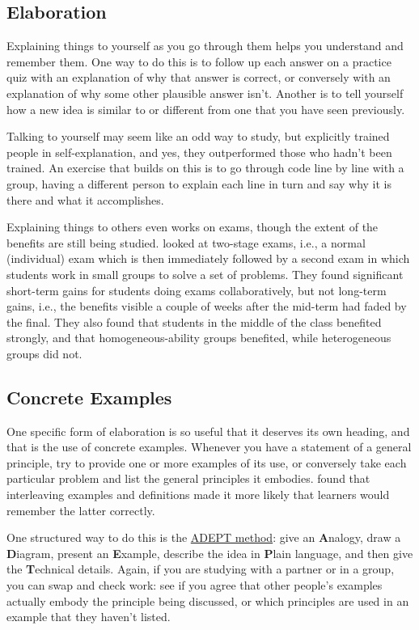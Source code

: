 \subsection*{Elaboration}

Explaining things to yourself as you go through them helps you
understand and remember them.  One way to do this is to follow up each
answer on a practice quiz with an explanation of why that answer is
correct, or conversely with an explanation of why some other plausible
answer isn't.  Another is to tell yourself how a new idea is similar
to or different from one that you have seen previously.

Talking to yourself may seem like an odd way to study, but
\cite{Biel1995} explicitly trained people in self-explanation, and
yes, they outperformed those who hadn't been trained.  An exercise
that builds on this is to go through code line by line with a group,
having a different person to explain each line in turn and say why it
is there and what it accomplishes.

Explaining things to others even works on exams, though the extent of
the benefits are still being studied.  \cite{Cao2017a,Cao2017b} looked
at two-stage exams, i.e., a normal (individual) exam which is then
immediately followed by a second exam in which students work in small
groups to solve a set of problems.  They found significant short-term
gains for students doing exams collaboratively, but not long-term
gains, i.e., the benefits visible a couple of weeks after the mid-term
had faded by the final.  They also found that students in the middle
of the class benefited strongly, and that homogeneous-ability groups
benefited, while heterogeneous groups did not.

\subsection*{Concrete Examples}

One specific form of elaboration is so useful that it deserves its own
heading, and that is the use of concrete examples.  Whenever you have
a statement of a general principle, try to provide one or more
examples of its use, or conversely take each particular problem and
list the general principles it embodies.  \cite{Raws2014} found that
interleaving examples and definitions made it more likely that
learners would remember the latter correctly.

One structured way to do this is the
\href{https://betterexplained.com/articles/adept-method/}{ADEPT
  method}: give an \textbf{A}nalogy, draw a \textbf{D}iagram, present
an \textbf{E}xample, describe the idea in \textbf{P}lain language, and
then give the \textbf{T}echnical details.  Again, if you are studying
with a partner or in a group, you can swap and check work: see if you
agree that other people's examples actually embody the principle being
discussed, or which principles are used in an example that they
haven't listed.

